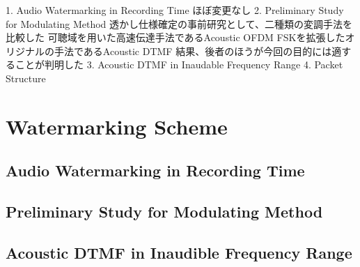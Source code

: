 1. Audio Watermarking in Recording Time
	ほぼ変更なし
2. Preliminary Study for Modulating Method
	透かし仕様確定の事前研究として、二種類の変調手法を比較した
	可聴域を用いた高速伝達手法であるAcoustic OFDM
	FSKを拡張したオリジナルの手法であるAcoustic DTMF
	結果、後者のほうが今回の目的には適することが判明した
3. Acoustic DTMF in Inaudable Frequency Range
4. Packet Structure
\fi

\chapter{Watermarking Scheme}

\section{Audio Watermarking in Recording Time}


\section{Preliminary Study for Modulating Method}


%

\section{Acoustic DTMF in Inaudible Frequency Range} 


